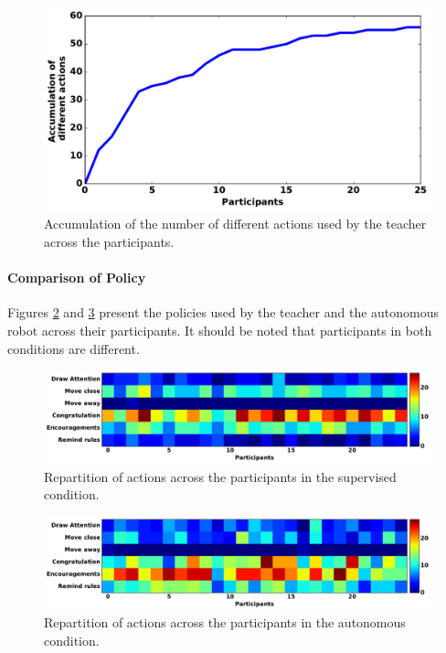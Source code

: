 \begin{figure}[ht]
	\includegraphics[width=.6\linewidth]{number_actions.pdf}
	\centering
	\caption{Accumulation of the number of different actions used by the teacher across the  participants.}
	\label{fig:tutoring_actions}
\end{figure}


\paragraph{Comparison of Policy}

Figures \ref{fig:tutoring_supervised_actions} and \ref{fig:tutoring_autonomous_actions} present the policies used by the teacher and the autonomous robot across their participants. It should be noted that participants in both conditions are different.


\begin{figure}[ht]
	\includegraphics[width=1\linewidth]{supervised_actions.pdf}
	\centering
	\caption{Repartition of actions across the participants in the supervised condition.}
	\label{fig:tutoring_supervised_actions}
\end{figure}

\begin{figure}[ht]
	\includegraphics[width=1\linewidth]{autonomous_actions.pdf}
	\centering
	\caption{Repartition of actions across the participants in the autonomous condition.}
	\label{fig:tutoring_autonomous_actions}
\end{figure}

